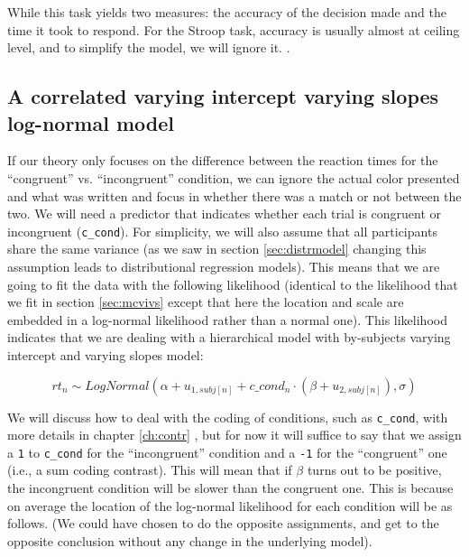 \documentclass[12pt,]{krantz}
\theoremstyle{definition}
\theoremstyle{definition}
\theoremstyle{definition}
\theoremstyle{remark}
\begin{document}
While this task yields two measures: the accuracy of the decision made and the time it took to respond. For the Stroop task, accuracy is usually almost at ceiling level, and to simplify the model, we will ignore it. \citep[See][ for a cognitive model that incorporates accuracy and reaction times in the same model to analyze the same Stroop data]{Nicenboim2018StanCon}.

\hypertarget{a-correlated-varying-intercept-varying-slopes-log-normal-model}{%
\subsection{A correlated varying intercept varying slopes log-normal model}\label{a-correlated-varying-intercept-varying-slopes-log-normal-model}}

If our theory only focuses on the difference between the reaction times for the ``congruent'' vs. ``incongruent'' condition, we can ignore the actual color presented and what was written and focus in whether there was a match or not between the two. We will need a predictor that indicates whether each trial is congruent or incongruent (\texttt{c\_cond}). For simplicity, we will also assume that all participants share the same variance (as we saw in section \ref{sec:distrmodel} changing this assumption leads to distributional regression models). This means that we are going to fit the data with the following likelihood (identical to the likelihood that we fit in section \ref{sec:mcvivs} except that here the location and scale are embedded in a log-normal likelihood rather than a normal one). This likelihood indicates that we are dealing with a hierarchical model with by-subjects varying intercept and varying slopes model:

\begin{equation}
  rt_n \sim LogNormal(\alpha + u_{1,subj[n]}  + c\_cond_n \cdot  (\beta + u_{2,subj[n]}), \sigma)
\end{equation}

We will discuss how to deal with the coding of conditions, such as \texttt{c\_cond}, with more details in chapter \ref{ch:contr} \citep[and see also][ for the mathematics underlying different kinds of contrasts]{schadHowCapitalizePriori2020}, but for now it will suffice to say that we assign a \texttt{1} to \texttt{c\_cond} for the ``incongruent'' condition and a \texttt{-1} for the ``congruent'' one (i.e., a sum coding contrast). This will mean that if \(\beta\) turns out to be positive, the incongruent condition will be slower than the congruent one. This is because on average the location of the log-normal likelihood for each condition will be as follows. (We could have chosen to do the opposite assignments, and get to the opposite conclusion without any change in the underlying model).
\end{document}
